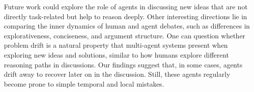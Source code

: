 Future work could explore the role of agents in discussing new ideas that are not directly task-related but help to reason deeply.
Other interesting directions lie in comparing the inner dynamics of human and agent debates, such as differences in explorativeness, conciseness, and argument structure.
One can question whether problem drift is a natural property that multi-agent systems present when exploring new ideas and solutions, similar to how humans explore different reasoning paths in discussions.
Our findings suggest that, in some cases, agents drift away to recover later on in the discussion. 
Still, these agents regularly become prone to simple temporal and local mistakes.







